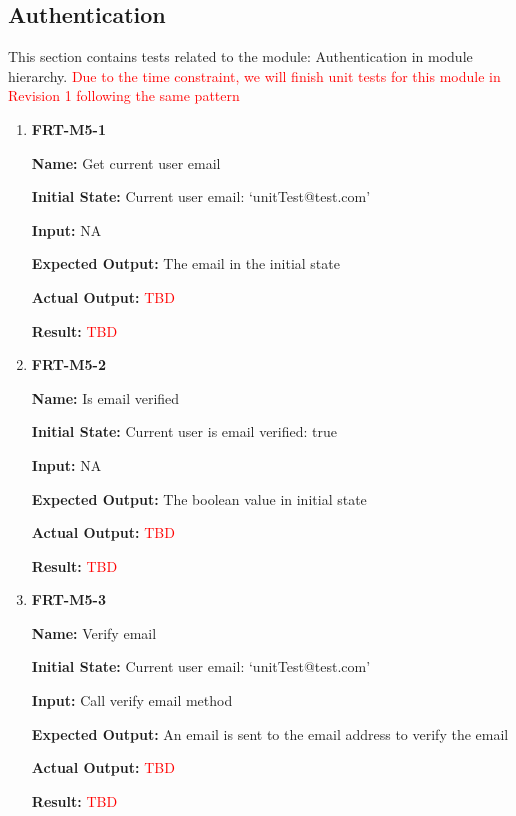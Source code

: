 \documentclass[12pt, titlepage]{article}
\begin{document}
\subsection{Authentication}
This section contains tests related to the module: Authentication in module hierarchy. \textcolor{red}{Due to the time constraint, we will finish unit tests for this module in Revision 1 following the same pattern}
\begin{enumerate}
\item \textbf{FRT-M5-1}

\textbf{Name:} Get current user email

\textbf{Initial State:} Current user email: `unitTest@test.com'
					
\textbf{Input:} NA
					
\textbf{Expected Output:} The email in the initial state

\textbf{Actual Output:} \textcolor{red}{TBD}

\textbf{Result:} \textcolor{red}{TBD}

\item \textbf{FRT-M5-2}

\textbf{Name:} Is email verified

\textbf{Initial State:} Current user is email verified: true
					
\textbf{Input:} NA
					
\textbf{Expected Output:} The boolean value in initial state 

\textbf{Actual Output:} \textcolor{red}{TBD}

\textbf{Result:} \textcolor{red}{TBD}

\item \textbf{FRT-M5-3}

\textbf{Name:} Verify email

\textbf{Initial State:} Current user email: `unitTest@test.com'
					
\textbf{Input:} Call verify email method
					
\textbf{Expected Output:} An email is sent to the email address to verify the email

\textbf{Actual Output:} \textcolor{red}{TBD}

\textbf{Result:} \textcolor{red}{TBD}
\end{enumerate}
\end{document}
